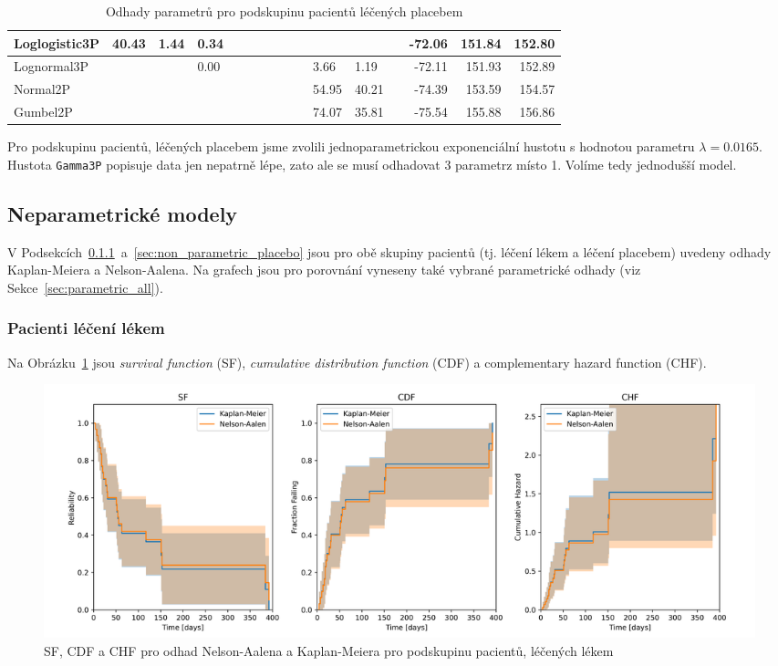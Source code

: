 \documentclass[a4, 11pt]{article}
\theoremstyle{definition}
\theoremstyle{remark}
\begin{document}
\begin{table}[H]
\begin{tabular}{|l|l|l|l|l|l|l|l|l|l|l|l|l|r|r|r|}
           Loglogistic3P  & 40.43  & 1.44 & 0.34 &       &      &        &       &      &      &       &       &      & -72.06 & 151.84 & 152.80 \\ \hline
           Lognormal3P    &        &      & 0.00 &       &      &        &       &      &      & 3.66  & 1.19  &      & -72.11 & 151.93 & 152.89 \\ \hline
           Normal2P       &        &      &      &       &      &        &       &      &      & 54.95 & 40.21 &      & -74.39 & 153.59 & 154.57 \\ \hline
           Gumbel2P       &        &      &      &       &      &        &       &      &      & 74.07 & 35.81 &      & -75.54 & 155.88 & 156.86 \\ \hline
       \end{tabular}
       \caption{Odhady parametrů pro podskupinu pacientů léčených placebem}
       \label{tab:fitall_output_parameters_tab_placebo}
       \normalsize
   \end{table}
    
    Pro podskupinu pacientů, léčených placebem jsme zvolili jednoparametrickou exponenciální hustotu s hodnotou parametru $\lambda = 0.0165$. Hustota \texttt{Gamma3P} popisuje data jen nepatrně lépe, zato ale se musí odhadovat 3 parametrz místo 1. Volíme tedy jednodušší model.
    
    
	
	\subsection{Neparametrické modely} \label{sec:non_parametric_all}
	V Podsekcích~\ref{sec:non_parametric_drugs}~a~\ref{sec:non_parametric_placebo} jsou pro obě skupiny pacientů (tj. léčení lékem a léčení placebem) uvedeny odhady Kaplan-Meiera a Nelson-Aalena.
	Na grafech jsou pro porovnání vyneseny také vybrané parametrické odhady (viz Sekce~\ref{sec:parametric_all}).
	
	\subsubsection{Pacienti léčení lékem} \label{sec:non_parametric_drugs}
	Na Obrázku~\ref{fig:four_men_drugs} jsou \textit{survival function} (SF), \textit{cumulative distribution function} (CDF) a complementary hazard function (CHF).
    
	\begin{figure}[H]
		\centering
		\includegraphics[width=0.9\linewidth]{img/four_men_drugs.png}
		\caption{SF, CDF a CHF pro odhad Nelson-Aalena a Kaplan-Meiera pro podskupinu pacientů, léčených lékem}
		\label{fig:four_men_drugs}
	\end{figure}
    
\end{document}
